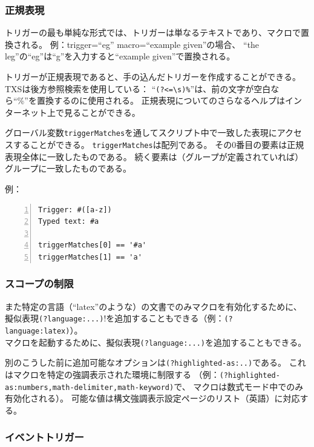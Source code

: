 \subsubsection{正規表現}

トリガーの最も単純な形式では、トリガーは単なるテキストであり、マクロで置換される。
例：trigger=``eg'' macro=``example given''の場合、
``the leg''の``eg''は``g''を入力すると``example given''で置換される。

トリガーが正規表現であると、手の込んだトリガーを作成することができる。
TXSは後方参照検索を使用している：
``\verb+(?<=\s)%+''は、前の文字が空白なら``\%''を置換するのに使用される。
正規表現についてのさらなるヘルプはインターネット上で見ることができる。

グローバル変数\verb+triggerMatches+を通してスクリプト中で一致した表現にアクセスすることができる。
\verb+triggerMatches+は配列である。
その0番目の要素は正規表現全体に一致したものである。
続く要素は（グループが定義されていれば）グループに一致したものである。

例：

\begin{lstlisting}[frame=single,breaklines=true,numbers=left]
Trigger: #([a-z])
Typed text: #a

triggerMatches[0] == '#a'
triggerMatches[1] == 'a'
\end{lstlisting}

\subsubsection{スコープの制限}

また特定の言語（``latex''のような）の文書でのみマクロを有効化するために、
擬似表現\verb+(?language:...)+!を追加することもできる（例：\verb+(?language:latex)+）。\\

マクロを起動するために、擬似表現\verb+(?language:...)+を追加することもできる。

別のこうした前に追加可能なオプションは\verb+(?highlighted-as:..)+である。
これはマクロを特定の強調表示された環境に制限する
（例：\verb+(?highlighted-as:numbers,math-delimiter,math-keyword)+で、
マクロは数式モード中でのみ有効化される）。
可能な値は構文強調表示設定ページのリスト（英語）に対応する。

\subsubsection{イベントトリガー}

